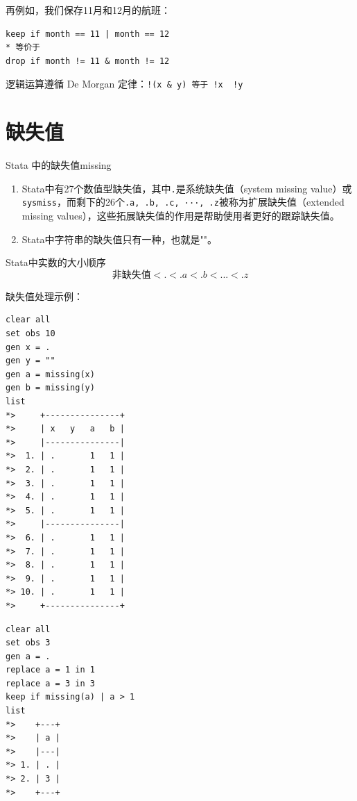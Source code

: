 再例如，我们保存11月和12月的航班：

\begin{lstlisting}
keep if month == 11 | month == 12
* 等价于
drop if month != 11 & month != 12
\end{lstlisting}

逻辑运算遵循 De Morgan 定律：\texttt{!(x\ \&\ y)\ 等于\ !x\ \textbar{}\ !y}

\section{缺失值}

\begin{definition}{Stata 中的缺失值}{missing}
  \begin{enumerate}
    \item Stata中有27个数值型缺失值，其中\texttt{.}是系统缺失值（system missing value）或\texttt{sysmiss}，而剩下的26个\texttt{.a,\ .b,\ .c,\ ···,\ .z}被称为扩展缺失值（extended missing values），这些拓展缺失值的作用是帮助使用者更好的跟踪缺失值。
    \item Stata中字符串的缺失值只有一种，也就是""。
  \end{enumerate}
\end{definition}

\begin{property}{Stata中实数的大小顺序}
  \begin{equation}
    \texttt{非缺失值} < . < .a < .b <  ...  < .z
  \end{equation}
\end{property}

缺失值处理示例：

\begin{lstlisting}
clear all
set obs 10
gen x = .
gen y = ""
gen a = missing(x)
gen b = missing(y)
list
*>     +---------------+
*>     | x   y   a   b |
*>     |---------------|
*>  1. | .       1   1 |
*>  2. | .       1   1 |
*>  3. | .       1   1 |
*>  4. | .       1   1 |
*>  5. | .       1   1 |
*>     |---------------|
*>  6. | .       1   1 |
*>  7. | .       1   1 |
*>  8. | .       1   1 |
*>  9. | .       1   1 |
*> 10. | .       1   1 |
*>     +---------------+
\end{lstlisting}

\begin{lstlisting}
clear all
set obs 3
gen a = .
replace a = 1 in 1
replace a = 3 in 3
keep if missing(a) | a > 1
list
*>    +---+
*>    | a |
*>    |---|
*> 1. | . |
*> 2. | 3 |
*>    +---+
\end{lstlisting}

